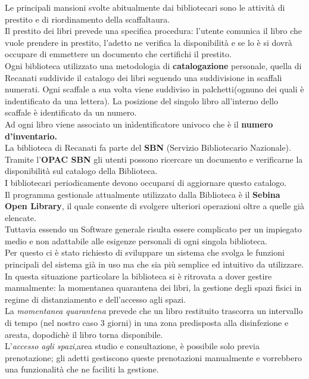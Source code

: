 \documentclass{tstextbook}
\begin{document}
Le principali mansioni svolte abitualmente dai bibliotecari sono le attività di prestito e di riordinamento della scaffaltaura.\\
Il prestito dei libri prevede una specifica procedura: l'utente comunica il libro che vuole prendere in prestito, l'adetto ne  verifica la disponibilità e se lo è si dovrà occupare di emmettere un documento che certifichi il prestito.\\
Ogni biblioteca utilizzato una metodologia di \textbf{catalogazione} personale, quella di Recanati suddivide il catalogo dei libri seguendo una suddivisione in scaffali numerati. Ogni scaffale a sua volta viene suddiviso in palchetti(ognuno dei quali è indentificato da una lettera).
La posizione del singolo libro all'interno dello scaffale è identificato da un numero.\\
Ad ogni libro viene associato un inìdentificatore univoco che è il \textbf{numero d'inventario.}\\

La biblioteca di Recanati fa parte del \textbf{SBN} (Servizio Bibliotecario Nazionale). Tramite l'\textbf{OPAC SBN} gli utenti possono ricercare un documento e verificarne la disponibilità sul catalogo della Biblioteca.\\
I bibliotecari periodicamente devono occuparsi di aggiornare questo catalogo.\\

Il programma gestionale attualmente utilizzato dalla Biblioteca è il \textbf{Sebina Open Library}, il quale consente di svolgere ulteriori operazioni oltre a quelle già elencate.\\
Tuttavia essendo un Software generale risulta essere complicato per un impiegato medio e non adattabile alle esigenze personali di ogni singola biblioteca.\\
Per questo ci è stato richiesto di sviluppare un sistema che svolga le funzioni principali del sistema già in uso ma che sia più semplice ed intuitivo da utilizzare.\\

In questa situazione particolare la biblioteca si è ritrovata a dover gestire manualmente: la momentanea quarantena dei libri, la gestione degli spazi fisici in regime di distanziamento e dell'accesso agli spazi.\\
La \textit{momentanea quarantena} prevede che un libro restituito trascorra un intervallo di tempo (nel nostro caso 3 giorni) in una zona predisposta alla disinfezione e areata, dopodichè il libro torna disponibile.\\
L'\textit{accesso agli spazi},area studio e consultazione, è possibile solo previa prenotazione; gli adetti gestiscono queste prenotazioni manualmente e vorrebbero una funzionalità che ne faciliti la gestione.\\
\end{document}
